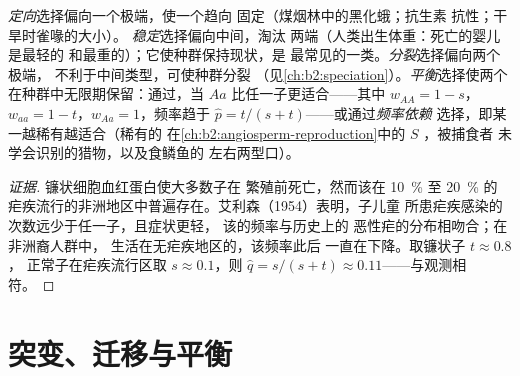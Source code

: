 \begin{proposition}[选择的类型]\label{prop:b2:population-genetics:kinds}
\emph{定向}选择偏向一个极端，使一个趋向
固定（煤烟林中的黑化蛾；抗生素
抗性；干旱时雀喙的大小）。
\emph{稳定}选择偏向中间，淘汰
两端（人类出生体重：死亡的婴儿是最轻的
和最重的）；它使种群保持现状，是
最常见的一类。\emph{分裂}选择偏向两个极端，
不利于中间类型，可使种群分裂
（见\cref{ch:b2:speciation}）。\emph{平衡}选择使两个
在种群中无限期保留：通过\emph{}，当 $Aa$ 比任一子更适合——其中
$w_{AA} = 1 - s$，$w_{aa} = 1 - t$，$w_{Aa} = 1$，频率趋于
$\hat p = t/(s + t)$——或通过\emph{频率依赖}
选择，即某一越稀有越适合（稀有的
在\cref{ch:b2:angiosperm-reproduction}中的 $S$ ，被捕食者
未学会识别的猎物，以及食鳞鱼的
左右两型口）。
\end{proposition}
\begin{proof}[证据]
镰状细胞血红蛋白使大多数子在
繁殖前死亡，然而该在 \qty{10}{\%} 至 \qty{20}{\%} 的
疟疾流行的非洲地区中普遍存在。艾利森（1954）表明，子儿童
所患疟疾感染的次数远少于任一子，且症状更轻，
该的频率与历史上的
恶性疟的分布相吻合；在非洲裔人群中，
生活在无疟疾地区的，该频率此后
一直在下降。取镰状子 $t \approx 0.8$，
正常子在疟疾流行区取 $s \approx 0.1$，则
$\hat q = s/(s + t) \approx 0.11$——与观测相符。
\end{proof}

\section{突变、迁移与平衡}

